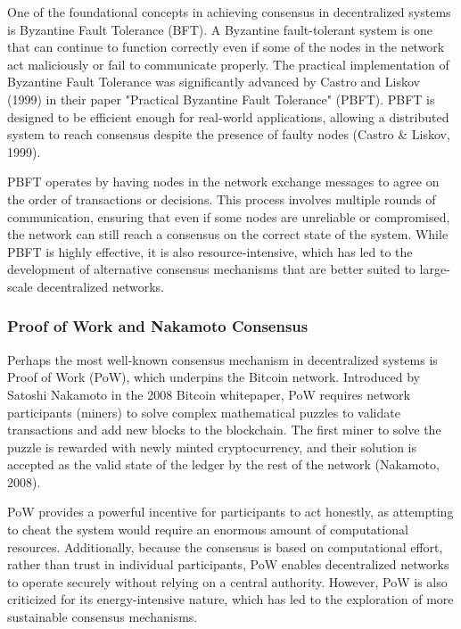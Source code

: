 \documentclass[12pt,twoside]{article}
\begin{document}
One of the foundational concepts in achieving consensus in decentralized systems is Byzantine Fault Tolerance (BFT). A Byzantine fault-tolerant system is one that can continue to function correctly even if some of the nodes in the network act maliciously or fail to communicate properly. The practical implementation of Byzantine Fault Tolerance was significantly advanced by Castro and Liskov (1999) in their paper "Practical Byzantine Fault Tolerance" (PBFT). PBFT is designed to be efficient enough for real-world applications, allowing a distributed system to reach consensus despite the presence of faulty nodes (Castro & Liskov, 1999).

PBFT operates by having nodes in the network exchange messages to agree on the order of transactions or decisions. This process involves multiple rounds of communication, ensuring that even if some nodes are unreliable or compromised, the network can still reach a consensus on the correct state of the system. While PBFT is highly effective, it is also resource-intensive, which has led to the development of alternative consensus mechanisms that are better suited to large-scale decentralized networks.

\subsubsection{Proof of Work and Nakamoto Consensus}

Perhaps the most well-known consensus mechanism in decentralized systems is Proof of Work (PoW), which underpins the Bitcoin network. Introduced by Satoshi Nakamoto in the 2008 Bitcoin whitepaper, PoW requires network participants (miners) to solve complex mathematical puzzles to validate transactions and add new blocks to the blockchain. The first miner to solve the puzzle is rewarded with newly minted cryptocurrency, and their solution is accepted as the valid state of the ledger by the rest of the network (Nakamoto, 2008).

PoW provides a powerful incentive for participants to act honestly, as attempting to cheat the system would require an enormous amount of computational resources. Additionally, because the consensus is based on computational effort, rather than trust in individual participants, PoW enables decentralized networks to operate securely without relying on a central authority. However, PoW is also criticized for its energy-intensive nature, which has led to the exploration of more sustainable consensus mechanisms.
\end{document}
